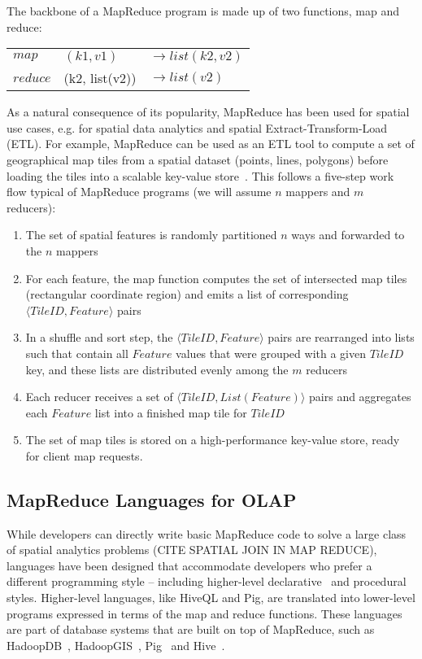\documentclass[11pt, oneside]{report}   	%
\begin{document}
The backbone of a MapReduce program is made up of two functions, map and reduce:

\begin{tabular}{l l l}
$map$ & $(k1, v1)$ & $\rightarrow list(k2, v2)$\\ 
$reduce$ & (k2, list(v2)) & $\rightarrow list(v2)$ \\
\end{tabular}

As a natural consequence of its popularity, MapReduce has been used for spatial use cases, e.g. for spatial data analytics and spatial Extract-Transform-Load (ETL). For example, MapReduce can be used as an ETL tool to compute a set of geographical map tiles from a spatial dataset (points, lines, polygons) before loading the tiles into a scalable key-value store~\cite{dean2009lessons}. This follows a five-step work flow typical of MapReduce programs (we will assume $n$ mappers and $m$ reducers):

\begin{enumerate}
\item The set of spatial features is randomly partitioned $n$ ways and forwarded to the $n$ mappers

\item For each feature, the map function computes the set of intersected map tiles (rectangular coordinate region) and emits a list of corresponding $\langle TileID, Feature \rangle$ pairs

\item In a shuffle and sort step, the $\langle TileID, Feature \rangle$ pairs are rearranged into lists such that contain all $Feature$ values that were grouped with a given $TileID$ key, and these lists are distributed evenly among the $m$ reducers

\item Each reducer receives a set of $\langle TileID, List(Feature) \rangle$ pairs and aggregates each $Feature$ list into a finished map tile for $TileID$

\item The set of map tiles is stored on a high-performance key-value store, ready for client map requests. 
\end{enumerate}

\subsection{MapReduce Languages for OLAP}

While developers can directly write basic MapReduce code to solve a large class of spatial analytics problems (CITE SPATIAL JOIN IN MAP REDUCE), languages have been designed that accommodate developers who prefer a different programming style -- including higher-level declarative~\cite{thusoo2009hive} and procedural~\cite{olston2008pig,eldawy2014pigeon} styles. Higher-level languages, like HiveQL and Pig, are translated into lower-level programs expressed in terms of the map and reduce functions. These languages are part of database systems that are built on top of MapReduce, such as HadoopDB~\cite{abouzeid2009hadoopdb}, HadoopGIS~\cite{aji2013hadoopgis}, Pig~\cite{eldawy2014pigeon, olston2008pig} and Hive~\cite{thusoo2009hive}.
\end{document}
